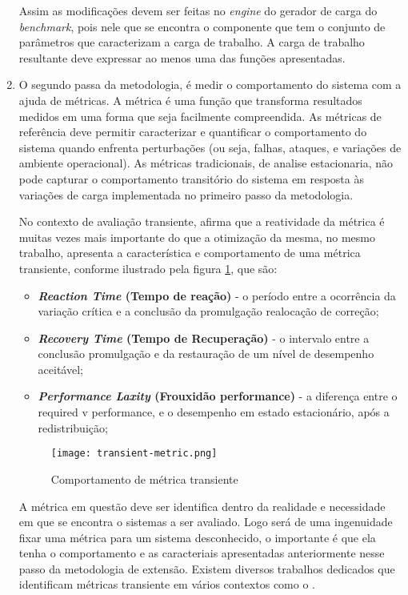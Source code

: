 \begin{enumerate}
	Assim as modificações devem ser feitas no \textit{engine} do gerador de carga do \textit{benchmark}, pois nele que se encontra o componente que tem o conjunto de parâmetros que caracterizam a carga de trabalho. A carga de trabalho resultante deve expressar ao menos uma das funções apresentadas.
		
	
	\item O segundo passa da metodologia, é medir o comportamento do sistema com a ajuda de métricas. A métrica é uma função que transforma resultados medidos em uma forma que seja facilmente compreendida. \cite{Folkerts2013} As métricas de referência deve permitir caracterizar e quantificar o comportamento do sistema quando enfrenta perturbações (ou seja, falhas, ataques, e variações de ambiente operacional).\cite{Marco2012} As métricas tradicionais, de analise estacionaria, não pode capturar o comportamento transitório do sistema em resposta às variações de carga implementada no primeiro passo da metodologia.
	
	No contexto de avaliação transiente, \cite{Rosu1997} afirma que a reatividade da métrica é muitas vezes mais importante do que a otimização da mesma, no mesmo trabalho, \cite{Rosu1997} apresenta a característica e comportamento de uma métrica transiente, conforme ilustrado pela figura \ref{fig:transient-metric}, que são: 
	\begin{itemize}
		\item \textbf{\textit{Reaction Time} (Tempo de reação)} - o período entre a ocorrência da variação crítica e a conclusão da promulgação realocação de correção;
		
		\item \textbf{\textit{Recovery Time} (Tempo de Recuperação)}  - o intervalo entre a conclusão promulgação e da restauração de um nível de desempenho aceitável;
		
		\item \textbf{\textit{Performance Laxity} (Frouxidão performance)} - a diferença entre o required v performance, e o desempenho em estado estacionário, após a redistribuição;
	\end{itemize}
	
	
	\begin{figure}[htb]
		\caption{Comportamento de métrica transiente}
		\label{fig:transient-metric}
		\centering
		\texttt{[image: transient-metric.png]}
	\end{figure}
	
	
	A métrica em questão deve ser identifica dentro da realidade e necessidade em que se encontra o sistemas a ser avaliado. Logo será de uma ingenuidade fixar uma métrica para um sistema desconhecido, o importante é que ela tenha o comportamento e as caracteriais apresentadas anteriormente nesse passo da metodologia de extensão. Existem diversos trabalhos dedicados que identificam métricas transiente em vários contextos como o \cite{Binnig2009, Lu2000, Rosu1997}.
	

\end{enumerate}
